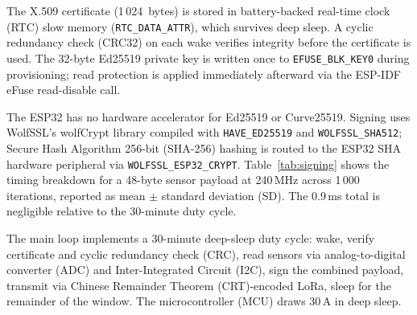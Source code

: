 \documentclass[a4paper,fleqn]{cas-dc}
\begin{document}
The X.509 certificate (1\,024~bytes) is stored in battery-backed
real-time clock (RTC) slow memory (\texttt{RTC\_DATA\_ATTR}), which
survives deep sleep. A cyclic redundancy check (CRC32) on each wake
verifies integrity before the certificate is used. The 32-byte Ed25519 private key is written once to
\texttt{EFUSE\_BLK\_KEY0} during provisioning; read protection is
applied immediately afterward via the ESP-IDF eFuse read-disable call.

The ESP32 has no hardware accelerator for Ed25519 or Curve25519.
Signing uses WolfSSL's wolfCrypt library compiled with
\texttt{HAVE\_ED25519} and \texttt{WOLFSSL\_SHA512}; Secure Hash Algorithm 256-bit (SHA-256) hashing
is routed to the ESP32 SHA hardware peripheral via
\texttt{WOLFSSL\_ESP32\_CRYPT}. Table~\ref{tab:signing} shows the
timing breakdown for a 48-byte sensor payload at 240\,MHz across
1\,000 iterations, reported as mean $\pm$ standard deviation (SD).
The 0.9\,ms total is negligible relative to the 30-minute duty cycle.

\begin{table}[pos=t]
\caption{ESP32 signing pipeline timing (48-byte payload,
  240\,MHz, $n{=}1\,000$ iterations, mean\,$\pm$\,SD).}
\label{tab:signing}
\end{table}

The main loop implements a 30-minute deep-sleep duty cycle: wake,
verify certificate and cyclic redundancy check (CRC), read sensors via
analog-to-digital converter (ADC) and Inter-Integrated Circuit (I2C),
sign the combined payload, transmit via Chinese Remainder Theorem
(CRT)-encoded LoRa, sleep for the remainder of the window. The
microcontroller (MCU) draws 30\,\textmu{}A in deep sleep.
\end{document}
